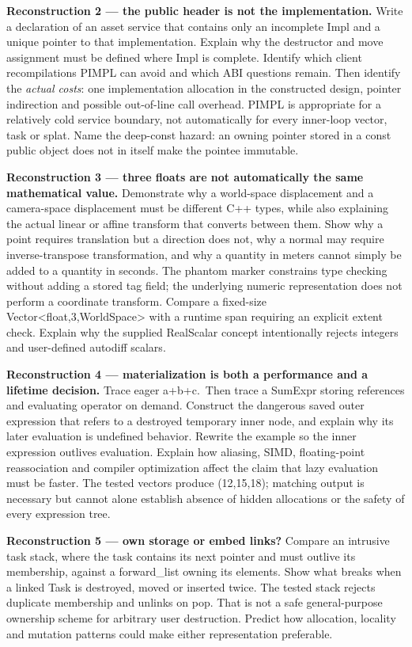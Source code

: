 \textbf{Reconstruction 2 --- the public header is not the implementation.} Write a declaration of an asset service that contains only an incomplete Impl and a unique pointer to that implementation. Explain why the destructor and move assignment must be defined where Impl is complete. Identify which client recompilations PIMPL can avoid and which ABI questions remain. Then identify the \emph{actual costs}: one implementation allocation in the constructed design, pointer indirection and possible out-of-line call overhead. PIMPL is appropriate for a relatively cold service boundary, not automatically for every inner-loop vector, task or splat. Name the deep-const hazard: an owning pointer stored in a const public object does not in itself make the pointee immutable.

\textbf{Reconstruction 3 --- three floats are not automatically the same mathematical value.} Demonstrate why a world-space displacement and a camera-space displacement must be different C++ types, while also explaining the actual linear or affine transform that converts between them. Show why a point requires translation but a direction does not, why a normal may require inverse-transpose transformation, and why a quantity in meters cannot simply be added to a quantity in seconds. The phantom marker constrains type checking without adding a stored tag field; the underlying numeric representation does not perform a coordinate transform. Compare a fixed-size Vector\textless float,3,WorldSpace\textgreater{} with a runtime span requiring an explicit extent check. Explain why the supplied RealScalar concept intentionally rejects integers and user-defined autodiff scalars.

\textbf{Reconstruction 4 --- materialization is both a performance and a lifetime decision.} Trace eager a+b+c.~Then trace a SumExpr storing references and evaluating operator on demand. Construct the dangerous saved outer expression that refers to a destroyed temporary inner node, and explain why its later evaluation is undefined behavior. Rewrite the example so the inner expression outlives evaluation. Explain how aliasing, SIMD, floating-point reassociation and compiler optimization affect the claim that lazy evaluation must be faster. The tested vectors produce (12,15,18); matching output is necessary but cannot alone establish absence of hidden allocations or the safety of every expression tree.

\textbf{Reconstruction 5 --- own storage or embed links?} Compare an intrusive task stack, where the task contains its next pointer and must outlive its membership, against a forward\_list owning its elements. Show what breaks when a linked Task is destroyed, moved or inserted twice. The tested stack rejects duplicate membership and unlinks on pop. That is not a safe general-purpose ownership scheme for arbitrary user destruction. Predict how allocation, locality and mutation patterns could make either representation preferable.

